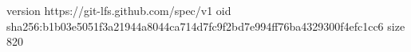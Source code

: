 version https://git-lfs.github.com/spec/v1
oid sha256:b1b03e5051f3a21944a8044ca714d7fc9f2bd7e994ff76ba4329300f4efc1cc6
size 820
